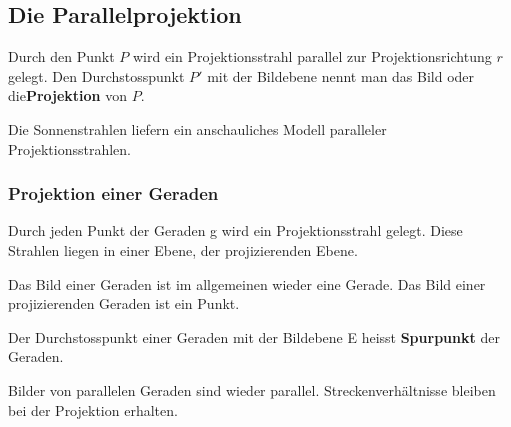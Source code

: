 \documentclass[%
11pt,%
twoside,%
titlepage,%
a4page,%
german,%
headsepline%
]{scrartcl}
\begin{document}
\pagebreak

\subsection{Die Parallelprojektion}
\begin{defn}
Durch den Punkt $P$ wird ein Projektionsstrahl parallel zur Projektionsrichtung $r$ gelegt. Den Durchstosspunkt $P'$ mit der Bildebene nennt man das Bild oder die\textbf{Projektion} von $P$.
\end{defn}
\begin{center}
\end{center}

\begin{bem}
Die Sonnenstrahlen liefern ein anschauliches Modell paralleler Projektionsstrahlen.
\end{bem}

\subsubsection{Projektion einer Geraden}
Durch jeden Punkt der Geraden g wird ein Projektionsstrahl gelegt. Diese Strahlen liegen in einer Ebene, der projizierenden Ebene.

Das Bild einer Geraden ist im allgemeinen wieder eine Gerade. Das Bild einer projizierenden Geraden ist ein Punkt.
\begin{defn}
Der Durchstosspunkt einer Geraden mit der Bildebene E heisst \textbf{Spurpunkt} der Geraden.
\end{defn}
Bilder von parallelen Geraden sind wieder parallel. Streckenverh\"altnisse bleiben bei der Projektion erhalten.
\end{document}
